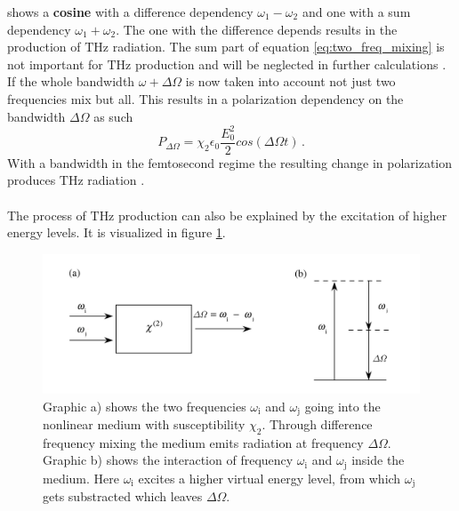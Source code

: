 shows a \textbf{cosine} with a difference dependency $\omega_1-\omega_2$ and one with a sum dependency $\omega_1+\omega_2$.
The one with the difference depends results in the production of $\si{\tera\hertz}$ radiation. %
The sum part of equation \eqref{eq:two_freq_mixing} is not important for $\si{\tera\hertz}$ production and will be neglected in further calculations \cite[45--46]{wiki_book}.
If the whole bandwidth $\omega + \Delta\Omega$ is now taken into account not just two frequencies mix but all.
This results in a polarization dependency on the bandwidth $\Delta\Omega$ as such
\begin{equation}
    P_{\Delta\Omega} = \chi_2 \epsilon_0 \frac{E_0^2}{2}cos(\Delta\Omega t) \, .
    \label{eq:polarization_depens}
\end{equation}
With a bandwidth in the femtosecond regime the resulting change in polarization produces $\si{\tera\hertz}$ radiation \cite[289--291]{book_optical_rectification}\cite[46]{wiki_book}.
\\\\
The process of $\si{\tera\hertz}$ production can also be explained by the excitation of higher energy levels.
It is visualized in figure \ref{fig:freq_mix}.
\begin{figure}
    \centering
    \includegraphics[width=\textwidth]{refferenced_pic/diffrence_frequency_mixing.PNG}
    \caption{Graphic a) shows the two frequencies $\omega_\text{i} $ and $\omega_\text{j}$ going into the nonlinear medium with susceptibility $\chi_2$.
    Through difference frequency mixing the medium emits radiation at frequency $\Delta\Omega$.
    Graphic b) shows the interaction of frequency $\omega_\text{i} $ and $\omega_\text{j}$ inside the medium.
    Here $\omega_\text{i}$ excites a higher virtual energy level, from which $\omega_\text{j}$ gets substracted which leaves $\Delta\Omega$.}
    \label{fig:freq_mix}
\end{figure}
